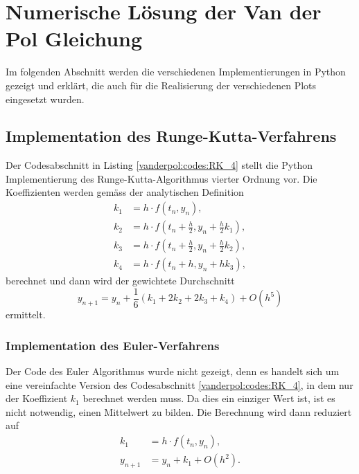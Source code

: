 %
%
%
\section{Numerische Lösung der Van der Pol Gleichung
\label{vanderpol:section:loesung}}
Im folgenden Abschnitt werden die verschiedenen Implementierungen in Python gezeigt und erklärt, die auch für die Realisierung der verschiedenen Plots eingesetzt wurden.
%

\subsection{Implementation des Runge-Kutta-Verfahrens
\label{vanderpol:subsection:rk}}
Der Codesabschnitt in Listing \ref{vanderpol:codes:RK_4} stellt die Python Implementierung des Runge-Kutta-Algorithmus vierter Ordnung vor. Die Koeffizienten werden gemäss der analytischen Definition
%
\begin{align*}
k_1 &= h \cdot f(t_n, y_n),\\
k_2 &= h \cdot f\left(t_n + \frac{h}{2}, y_n + \frac{h}{2} k_1\right), \\
k_3 &= h \cdot f\left(t_n + \frac{h}{2}, y_n + \frac{h}{2} k_2\right), \\
k_4 &= h \cdot f(t_n + h, y_n + h k_3),
\end{align*}
berechnet und dann wird der gewichtete Durchschnitt
\begin{equation}
y_{n+1} = y_n + \frac{1}{6}(k_1 + 2k_2 + 2k_3 + k_4) +O(h^5)
\end{equation}
ermittelt.
\subsubsection{Implementation des Euler-Verfahrens
\label{vanderpol:subsubsection:euler}}
Der Code des Euler Algorithmus wurde nicht gezeigt, denn es handelt sich um eine vereinfachte Version des Codesabschnitt \ref{vanderpol:codes:RK_4}, in dem nur der Koeffizient $k_1$ berechnet werden muss. Da dies ein einziger Wert ist, ist es nicht notwendig, einen Mittelwert zu bilden. Die Berechnung wird dann reduziert auf
\begin{align*}
k_1 &= h \cdot f(t_n, y_n), \\
y_{n+1} &= y_n + k_1 +O(h^2).
\end{align*}

